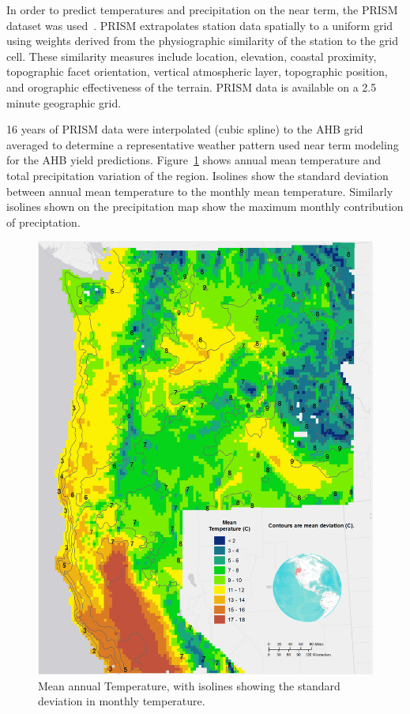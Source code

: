 \documentclass[preprint,12pt]{elsarticle}
\begin{document}
In order to predict temperatures and precipitation on the near term,
the \acf{PRISM} dataset was used~\cite{Daly2008a}.  \ac{PRISM}
extrapolates station data spatially to a uniform grid using weights
derived from the physiographic similarity of the station to the grid
cell. These similarity measures include location, elevation, coastal
proximity, topographic facet orientation, vertical atmospheric layer,
topographic position, and orographic effectiveness of the terrain.
\ac{PRISM} data is available on a 2.5 minute geographic grid.

16 years of \ac{PRISM} data were interpolated (cubic spline) to the
\ac{AHB} grid averaged to determine a representative weather pattern
used near term modeling for the \ac{AHB} yield predictions.
Figure~\ref{fig:temp} shows annual mean temperature and total
precipitation variation of the region.  Isolines show the standard
deviation between annual mean temperature to the monthly mean
temperature.  Similarly isolines shown on the precipitation map show
the maximum monthly contribution of preciptation.

\begin{figure}[hp]
  \centering  
  \includegraphics[width=1\linewidth]{temp}  
\caption{Mean annual Temperature, with isolines showing the standard deviation in monthly temperature.}
  \label{fig:temp}
\end{figure}
\end{document}
